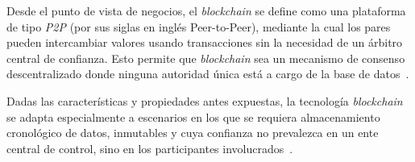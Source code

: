 Desde el punto de vista de negocios, el \textit{blockchain} se  define como una plataforma de tipo \textit{P2P} (por sus siglas en inglés Peer-to-Peer),  mediante la cual los pares pueden intercambiar valores usando transacciones sin la necesidad de un árbitro central de confianza. Esto permite que \textit{blockchain} sea un mecanismo de consenso descentralizado donde ninguna autoridad única está a cargo de la base de datos~\cite{bashir2017mastering}.

Dadas las características y propiedades antes expuestas, la tecnología \textit{blockchain}  se adapta especialmente a escenarios en los que se requiera almacenamiento cronológico de datos, inmutables y cuya confianza no prevalezca en un ente central de control, sino en los participantes involucrados~\cite{wiki:CadenaBloques}.

